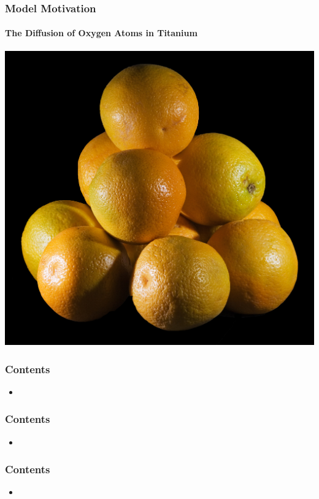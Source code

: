 \documentclass{beamer}
\begin{document}
\begin{frame}
\frametitle{Model Motivation}
\framesubtitle{The Diffusion of Oxygen Atoms in Titanium}
\begin{center}
\includegraphics[width=0.7\linewidth]{images/hcpOranges}
\end{center}
\end{frame}

\begin{frame}
\frametitle{Contents}
\begin{itemize}
\item{}
\end{itemize}
\end{frame}

\begin{frame}
\frametitle{Contents}
\begin{itemize}
\item{}
\end{itemize}
\end{frame}

\begin{frame}
\frametitle{Contents}
\begin{itemize}
\item{}
\end{itemize}
\end{frame}
\end{document}
